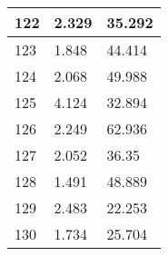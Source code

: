 \begin{table}[!ht]
\begin{tabular}{|l|l|l|}
        122 & 2.329 & 35.292 \\ \hline
        123 & 1.848 & 44.414 \\ \hline
        124 & 2.068 & 49.988 \\ \hline
        125 & 4.124 & 32.894 \\ \hline
        126 & 2.249 & 62.936 \\ \hline
        127 & 2.052 & 36.35 \\ \hline
        128 & 1.491 & 48.889 \\ \hline
        129 & 2.483 & 22.253 \\ \hline
        130 & 1.734 & 25.704 \\ \hline
    \end{tabular}
\end{table}

\endinput
